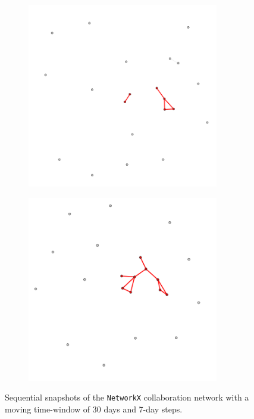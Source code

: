 \begin{figure}[!htbp]
\begin{subfigure}{0.3\textwidth}
        \caption{}
        \label{fig:temporal net D}
    \end{subfigure}
    \hfill
    \begin{subfigure}{0.3\textwidth}
        \centering
        \includegraphics[width=0.92\textwidth]{figures/temporal/4.png}
        \caption{}
        \label{fig:temporal net E}
    \end{subfigure}
    \hfill
    \begin{subfigure}{0.3\textwidth}
        \centering
        \includegraphics[width=0.92\textwidth]{figures/temporal/5.png}
        \caption{}
        \label{fig:temporal net F}
    \end{subfigure}
    \caption{Sequential snapshots of the \texttt{NetworkX} collaboration network with a moving time-window of 30 days and 7-day steps.}
    \label{fig:temporal net}
\end{figure}

